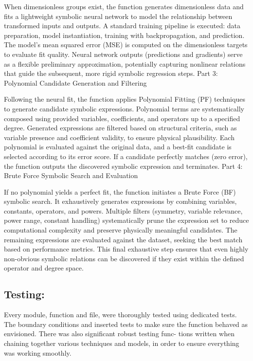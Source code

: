 \documentclass{article}
\begin{document}
{When dimensionless groups exist, the function generates dimensionless data and fits a lightweight symbolic neural network to model the relationship between transformed inputs and outputs. A standard training pipeline is executed: data preparation, model instantiation, training with backpropagation, and prediction. The model’s mean squared error (MSE) is computed on the dimensionless targets to evaluate fit quality. Neural network outputs (predictions and gradients) serve as a flexible preliminary approximation, potentially capturing nonlinear relations that guide the subsequent, more rigid symbolic regression steps.
Part 3: Polynomial Candidate Generation and Filtering

Following the neural fit, the function applies Polynomial Fitting (PF) techniques to generate candidate symbolic expressions. Polynomial terms are systematically composed using provided variables, coefficients, and operators up to a specified degree. Generated expressions are filtered based on structural criteria, such as variable presence and coefficient validity, to ensure physical plausibility. Each polynomial is evaluated against the original data, and a best-fit candidate is selected according to its error score. If a candidate perfectly matches (zero error), the function outputs the discovered symbolic expression and terminates.
Part 4: Brute Force Symbolic Search and Evaluation

If no polynomial yields a perfect fit, the function initiates a Brute Force (BF) symbolic search. It exhaustively generates expressions by combining variables, constants, operators, and powers. Multiple filters (symmetry, variable relevance, power range, constant handling) systematically prune the expression set to reduce computational complexity and preserve physically meaningful candidates. The remaining expressions are evaluated against the dataset, seeking the best match based on performance metrics. This final exhaustive step ensures that even highly non-obvious symbolic relations can be discovered if they exist within the defined operator and degree space.

\subsection{Testing:}
Every module, function and file, were thoroughly tested using dedicated tests. The boundary conditions and
inserted tests to make sure the function behaved as envisioned. There was also significant robust testing func-
tions written when chaining together various techniques and models, in order to ensure everything was working
smoothly.\\

}
\end{document}
